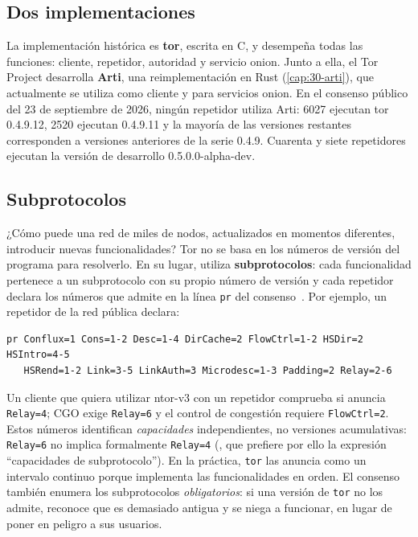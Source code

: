 \subsection{Dos implementaciones}

La implementación histórica es \textbf{tor}, escrita en C, y desempeña todas las funciones: cliente, repetidor, autoridad y servicio onion. Junto a ella, el Tor Project desarrolla \textbf{Arti}, una reimplementación en Rust (\cref{cap:30-arti}), que actualmente se utiliza como cliente y para servicios onion. En el consenso público del 23 de septiembre de 2026, ningún repetidor utiliza Arti: 6027 ejecutan tor 0.4.9.12, 2520 ejecutan 0.4.9.11 y la mayoría de las versiones restantes corresponden a versiones anteriores de la serie 0.4.9. Cuarenta y siete repetidores ejecutan la versión de desarrollo 0.5.0.0-alpha-dev.

\subsection{Subprotocolos}

¿Cómo puede una red de miles de nodos, actualizados en momentos diferentes, introducir nuevas funcionalidades? Tor no se basa en los números de versión del programa para resolverlo. En su lugar, utiliza \textbf{subprotocolos}: cada funcionalidad pertenece a un subprotocolo con su propio número de versión y cada repetidor declara los números que admite en la línea \texttt{pr} del consenso~. Por ejemplo, un repetidor de la red pública declara:
\begin{lstlisting}[numbers=none]
pr Conflux=1 Cons=1-2 Desc=1-4 DirCache=2 FlowCtrl=1-2 HSDir=2 HSIntro=4-5
   HSRend=1-2 Link=3-5 LinkAuth=3 Microdesc=1-3 Padding=2 Relay=2-6
\end{lstlisting}

Un cliente que quiera utilizar ntor-v3 con un repetidor comprueba si anuncia \texttt{Relay=4}; CGO exige \texttt{Relay=6} y el control de congestión requiere \texttt{FlowCtrl=2}. Estos números identifican \emph{capacidades} independientes, no versiones acumulativas: \texttt{Relay=6} no implica formalmente \texttt{Relay=4} (, que prefiere por ello la expresión \enquote{capacidades de subprotocolo}). En la práctica, \texttt{tor} las anuncia como un intervalo continuo porque implementa las funcionalidades en orden. El consenso también enumera los subprotocolos \emph{obligatorios}: si una versión de \texttt{tor} no los admite, reconoce que es demasiado antigua y se niega a funcionar, en lugar de poner en peligro a sus usuarios.

